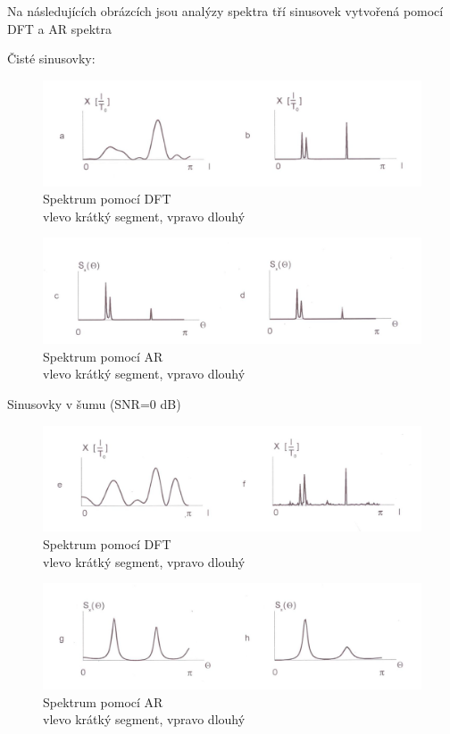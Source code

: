 \documentclass[a4paper,12pt]{article}   %
\begin{document}
Na následujících obrázcích jsou analýzy spektra tří sinusovek vytvořená pomocí DFT a AR spektra\\
{Čisté sinusovky:\\
\begin{figure}[!htb]
        \centering
        \includegraphics[width=.6\textwidth]{fig/DFT_clean.png}
        \caption*{Spektrum pomocí DFT\\ vlevo krátký segment, vpravo dlouhý}
\end{figure}
\begin{figure}[!htb]
        \centering
        \includegraphics[width=.6\textwidth]{fig/AR_clean.png}
        \caption*{Spektrum pomocí AR\\ vlevo krátký segment, vpravo dlouhý}
\end{figure}}
\FloatBarrier
Sinusovky v šumu (SNR=0 dB)\\
\begin{figure}[h!]
        \centering
        \includegraphics[width=.6\textwidth]{fig/DFT_noise.png}
        \caption*{Spektrum pomocí DFT\\ vlevo krátký segment, vpravo dlouhý}
\end{figure}
\begin{figure}[h!]
        \centering
        \includegraphics[width=.6\textwidth]{fig/AR_noise.png}
        \caption*{Spektrum pomocí AR\\ vlevo krátký segment, vpravo dlouhý}
\end{figure}
\FloatBarrier
\end{document}
